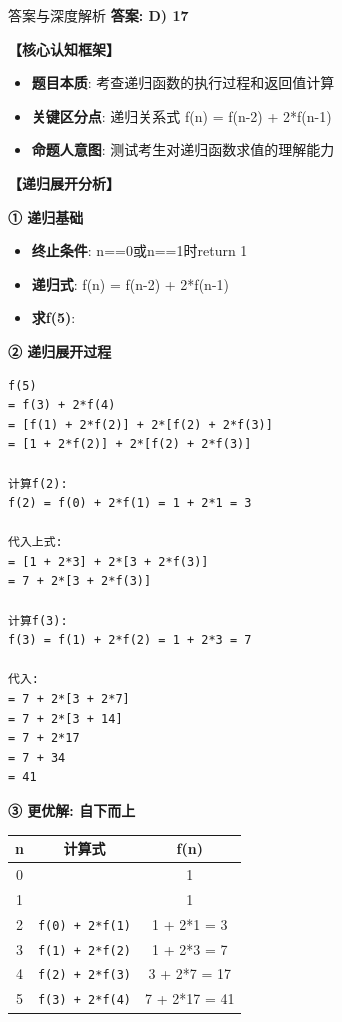 \documentclass[a4paper,12pt]{article}
\begin{document}
\begin{bluebox}{答案与深度解析}
	\textbf{答案: D) 17}

	\textbf{【核心认知框架】}
	\begin{itemize}[leftmargin=*, nosep]
		\item \textbf{题目本质}: 考查递归函数的执行过程和返回值计算
		\item \textbf{关键区分点}: 递归关系式 f(n) = f(n-2) + 2*f(n-1)
		\item \textbf{命题人意图}: 测试考生对递归函数求值的理解能力
	\end{itemize}

	\textbf{【递归展开分析】}

	\textbf{① 递归基础}
	\begin{itemize}[leftmargin=*, nosep]
		\item \textbf{终止条件}: n==0或n==1时return 1
		\item \textbf{递归式}: f(n) = f(n-2) + 2*f(n-1)
		\item \textbf{求f(5)}:
	\end{itemize}

	\textbf{② 递归展开过程}
	\begin{verbatim}
f(5)
= f(3) + 2*f(4)
= [f(1) + 2*f(2)] + 2*[f(2) + 2*f(3)]
= [1 + 2*f(2)] + 2*[f(2) + 2*f(3)]

计算f(2):
f(2) = f(0) + 2*f(1) = 1 + 2*1 = 3

代入上式:
= [1 + 2*3] + 2*[3 + 2*f(3)]
= 7 + 2*[3 + 2*f(3)]

计算f(3):
f(3) = f(1) + 2*f(2) = 1 + 2*3 = 7

代入:
= 7 + 2*[3 + 2*7]
= 7 + 2*[3 + 14]
= 7 + 2*17
= 7 + 34
= 41

\end{verbatim}

	\textbf{③ 更优解: 自下而上}

	\begin{tabular}{|c|c|c|}
		\hline
		\textbf{n} & \textbf{计算式}           & \textbf{f(n)} \\
		\hline
		0          &                        & 1             \\
		\hline
		1          &                        & 1             \\
		\hline
		2          & \texttt{f(0) + 2*f(1)} & 1 + 2*1 = 3   \\
		\hline
		3          & \texttt{f(1) + 2*f(2)} & 1 + 2*3 = 7   \\
		\hline
		4          & \texttt{f(2) + 2*f(3)} & 3 + 2*7 = 17  \\
		\hline
		5          & \texttt{f(3) + 2*f(4)} & 7 + 2*17 = 41 \\
		\hline
	\end{tabular}


\end{bluebox}
\end{document}
